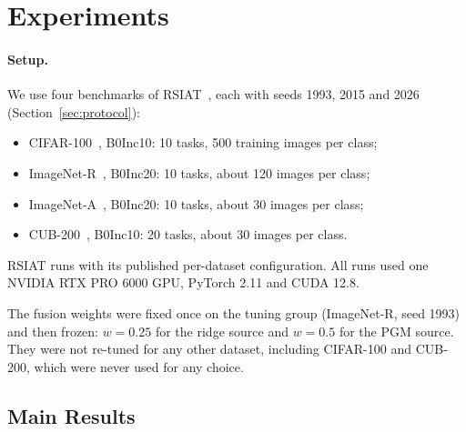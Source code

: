 \section{Experiments}
\label{sec:experiments}

\paragraph{Setup.}
We use four benchmarks of RSIAT~\cite{rsiat}, each with seeds 1993, 2015 and
2026 (Section~\ref{sec:protocol}):
\begin{itemize}
  \item CIFAR-100~\cite{krizhevsky2009cifar}, B0Inc10: 10 tasks, 500
    training images per class;
  \item ImageNet-R~\cite{hendrycks2021many}, B0Inc20: 10 tasks, about 120
    images per class;
  \item ImageNet-A~\cite{hendrycks2021nae}, B0Inc20: 10 tasks, about 30
    images per class;
  \item CUB-200~\cite{wah2011cub}, B0Inc10: 20 tasks, about 30 images per class.
\end{itemize}
RSIAT runs with its published per-dataset configuration. All runs used one
NVIDIA RTX PRO 6000 GPU, PyTorch 2.11 and CUDA 12.8.

The fusion weights were fixed once on the tuning group (ImageNet-R, seed
1993) and then frozen: $w=0.25$ for the ridge source and $w=0.5$ for the PGM
source. They were not re-tuned for any other dataset, including CIFAR-100
and CUB-200, which were never used for any choice.

\subsection{Main Results}


